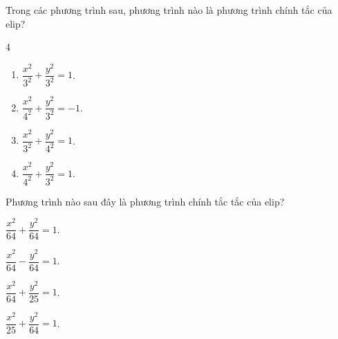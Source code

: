 \begin{bt}%
	Trong các phương trình sau, phương trình nào là phương trình chính tắc của elip?
	\begin{multicols}{4}
		\begin{enumerate}
			\item $\dfrac{x^2}{3^2}+\dfrac{y^2}{3^2}=1$.
			\item $\dfrac{x^2}{4^2}+\dfrac{y^2}{3^2}=-1$.
			\item $\dfrac{x^2}{3^2}+\dfrac{y^2}{4^2}=1$.
			\item $\dfrac{x^2}{4^2}+\dfrac{y^2}{3^2}=1$.
		\end{enumerate}
	\end{multicols}
\end{bt}

\begin{bt}%
	Phương trình nào sau đây là phương trình chính tắc tắc của elip?
	\begin{listEX}[4]
		\item $\dfrac{x^2}{64}+\dfrac{y^2}{64}=1$.
		\item $\dfrac{x^2}{64}-\dfrac{y^2}{64}=1$.
		\item $\dfrac{x^2}{64}+\dfrac{y^2}{25}=1$.
		\item $\dfrac{x^2}{25}+\dfrac{y^2}{64}=1$.
	\end{listEX}	
\end{bt}

